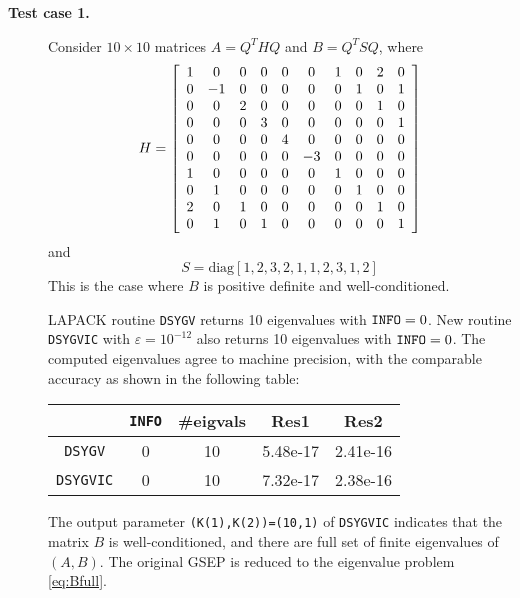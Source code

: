 \documentclass[11pt]{article}
\begin{document}
\begin{description} 
\item[{\bf Test case 1.}] Consider $10 \times 10$ matrices 
$A=Q^THQ$ and $B = Q^TSQ$, where 
\[
H=\left[\begin{array}{c c c c c c c c c c}
1 & 0 & 0 & 0 & 0 & 0 & 1 & 0 & 2 & 0 \\
0 &-1 & 0 & 0 & 0 & 0 & 0 & 1 & 0 & 1 \\
0 & 0 & 2 & 0 & 0 & 0 & 0 & 0 & 1 & 0 \\
0 & 0 & 0 & 3 & 0 & 0 & 0 & 0 & 0 & 1 \\
0 & 0 & 0 & 0 & 4 & 0 & 0 & 0 & 0 & 0 \\
0 & 0 & 0 & 0 & 0 &-3 & 0 & 0 & 0 & 0 \\
1 & 0 & 0 & 0 & 0 & 0 & 1 & 0 & 0 & 0 \\
0 & 1 & 0 & 0 & 0 & 0 & 0 & 1 & 0 & 0 \\
2 & 0 & 1 & 0 & 0 & 0 & 0 & 0 & 1 & 0 \\
0 & 1 & 0 & 1 & 0 & 0 & 0 & 0 & 0 & 1
\end{array}\right]
\]
and 
\[
S=\mbox{diag}[1,2,3,2,1,1,2,3,1,2]
\] 
This is the case where $B$ is positive definite and well-conditioned. 

LAPACK routine {\tt DSYGV} returns 10 eigenvalues with ${\tt INFO} = 0$. 
New routine {\tt DSYGVIC} with $\varepsilon = 10^{-12}$ also 
returns 10 eigenvalues with ${\tt INFO} = 0$. 
The computed eigenvalues agree to machine precision, with the 
comparable accuracy as shown in the following table: 
\begin{center}
  \begin{tabular}{ c || c | c | c | c } 
    		& {\tt INFO} & \#eigvals & Res1      & Res2   \\ \hline
  {\tt  DSYGV}   &  0   &  10       & 5.48e-17 & 2.41e-16 \\
  {\tt  DSYGVIC} &  0   &  10       & 7.32e-17 & 2.38e-16 \\ 
  \end{tabular}
\end{center}
The output parameter {\tt (K(1),K(2))=(10,1)}
of {\tt DSYGVIC} indicates that the matrix $B$ is well-conditioned, 
and there are full set of finite eigenvalues of $(A,B)$.
The original GSEP is reduced to the eigenvalue problem \eqref{eq:Bfull}.


\end{description}
\end{document}
